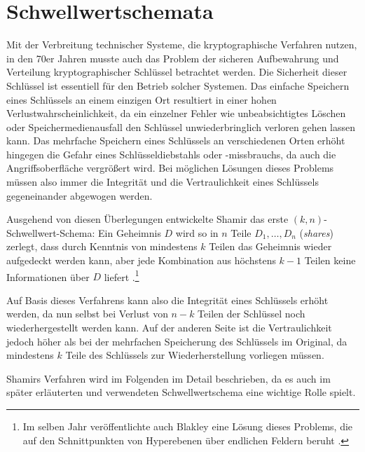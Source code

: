 \section{Schwellwertschemata}

\label{sec_basics_threshold}


Mit der Verbreitung technischer Systeme, die kryptographische Verfahren nutzen, in den 70er Jahren musste auch das Problem der sicheren Aufbewahrung und Verteilung kryptographischer Schlüssel betrachtet werden. Die Sicherheit dieser Schlüssel ist essentiell für den Betrieb solcher Systemen. Das einfache Speichern eines Schlüssels an einem einzigen Ort resultiert in einer hohen Verlustwahrscheinlichkeit, da ein einzelner Fehler wie unbeabsichtigtes Löschen oder Speichermedienausfall den Schlüssel unwiederbringlich verloren gehen lassen kann. Das mehrfache Speichern eines Schlüssels an verschiedenen Orten erhöht hingegen die Gefahr eines Schlüsseldiebstahls oder -missbrauchs, da auch die Angriffsoberfläche vergrößert wird. Bei möglichen Lösungen dieses Problems müssen also immer die Integrität und die Vertraulichkeit eines Schlüssels gegeneinander abgewogen werden. \cite{gemmell1997}

Ausgehend von diesen Überlegungen entwickelte Shamir das erste \((k,n)\)-Schwellwert-Schema: Ein Geheimnis \(D\) wird so in \(n\) Teile \(D_1, \dots, D_n\) (\textit{shares}) zerlegt, dass durch Kenntnis von mindestens \(k\) Teilen das Geheimnis wieder aufgedeckt werden kann, aber jede Kombination aus höchstens \(k-1\) Teilen keine Informationen über \(D\) liefert \cite{shamir1979}.\footnote{
  Im selben Jahr veröffentlichte auch Blakley eine Lösung dieses Problems, die auf den Schnittpunkten von Hyperebenen über endlichen Feldern beruht \cite{blakley1979}.
} 

Auf Basis dieses Verfahrens kann also die Integrität eines Schlüssels erhöht werden, da nun selbst bei Verlust von \(n-k\) Teilen der Schlüssel noch wiederhergestellt werden kann. Auf der anderen Seite ist die Vertraulichkeit jedoch höher als bei der mehrfachen Speicherung des Schlüssels im Original, da mindestens \(k\) Teile des Schlüssels zur Wiederherstellung vorliegen müssen.

Shamirs Verfahren wird im Folgenden im Detail beschrieben, da es auch im später erläuterten und verwendeten Schwellwertschema eine wichtige Rolle spielt.

